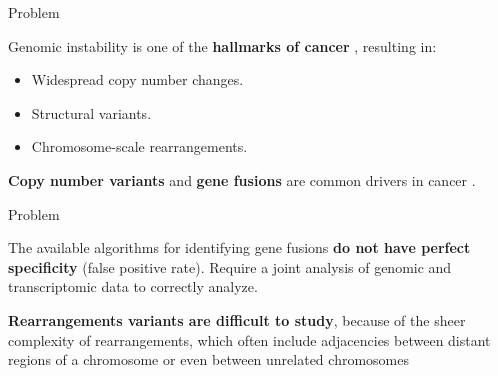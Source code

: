 \documentclass[10pt]{beamer}
\newcommand{\1}{
	\setbeamertemplate{background}{
		\texttt{[image: img/1]}
		\tikz[overlay] \fill[fill opacity=0.75,fill=white] (0,0) rectangle (-\paperwidth,\paperheight);
	}
}
\begin{document}
\begin{frame}{Problem}{}		
	\begin{block}{}		
		Genomic instability is one of the \textbf{hallmarks of cancer} \cite{hanahan2011hallmarks,hastings2009mechanisms},	resulting in:
		\begin{itemize}
			\item Widespread copy number changes.
			\item Structural variants.
			\item Chromosome-scale rearrangements.
		\end{itemize}			
	\end{block}	

	\begin{block}{}		
		\textbf{Copy number variants} and \textbf{gene fusions} are common drivers in cancer \cite{shlien2009copy, mitelman2007impact}.
	\end{block}	
\end{frame}


\begin{frame}{Problem}{}
	\begin{block}{}
		The available algorithms for identifying gene fusions \textbf{do not have perfect specificity} (false positive rate). Require a joint	analysis of genomic and transcriptomic data to correctly analyze.
	\end{block}

	\begin{block}{}
		\textbf{Rearrangements variants are difficult to study}, because of the sheer complexity of rearrangements, which often include adjacencies between distant regions of a chromosome or even between unrelated chromosomes
	\end{block}

\end{frame}


\end{document}

